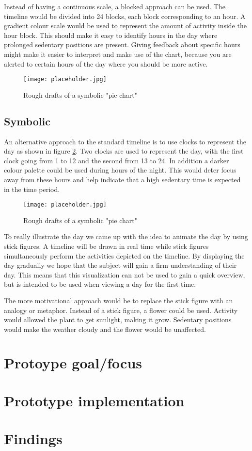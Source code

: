 Instead of having a continuous scale, a blocked approach can be used. The timeline would be divided into 24 blocks, each block corresponding to an hour. A gradient colour scale would be used to represent the amount of activity inside the hour block. This should make it easy to identify hours in the day where prolonged sedentary positions are present. Giving feedback about specific hours might make it easier to interpret and make use of the chart, because you are alerted to certain hours of the day where you should be more active.

\begin{figure}[h!]
	\centering
		\texttt{[image: placeholder.jpg]}
		\caption{\footnotesize Rough drafts of a symbolic "pie chart"}
		\label{fig:simpleTimeline}
\end{figure}

\subsection{Symbolic}
An alternative approach to the standard timeline is to use clocks to represent the day as shown in figure \ref{fig:clock}. Two clocks are used to represent the day, with the first clock going from 1 to 12 and the second from 13 to 24.
 In addition a darker colour palette could be used during hours of the night. This would deter focus away from these hours and help indicate that a high sedentary time is expected in the time period.

\begin{figure}[h!]
	\centering
		\texttt{[image: placeholder.jpg]}
		\caption{\footnotesize Rough drafts of a symbolic "pie chart"}
		\label{fig:clock}
\end{figure}
To really illustrate the day we came up with the idea to animate the day by using stick figures. A timeline will be drawn in real time while stick figures simultaneously perform the activities depicted on the timeline. By displaying the day gradually we hope that the subject will gain a firm understanding of their day. This means that this visualization can not be used to gain a quick overview, but is intended to be used when viewing a day for the first time.

The more motivational approach would be to replace the stick figure with an analogy or metaphor. Instead of a stick figure, a flower could be used. Activity would allowed the plant to get sunlight, making it grow. Sedentary positions would make the weather cloudy and the flower would be unaffected.

\section{Protoype goal/focus}

\section{Prototype implementation}

\section{Findings}
